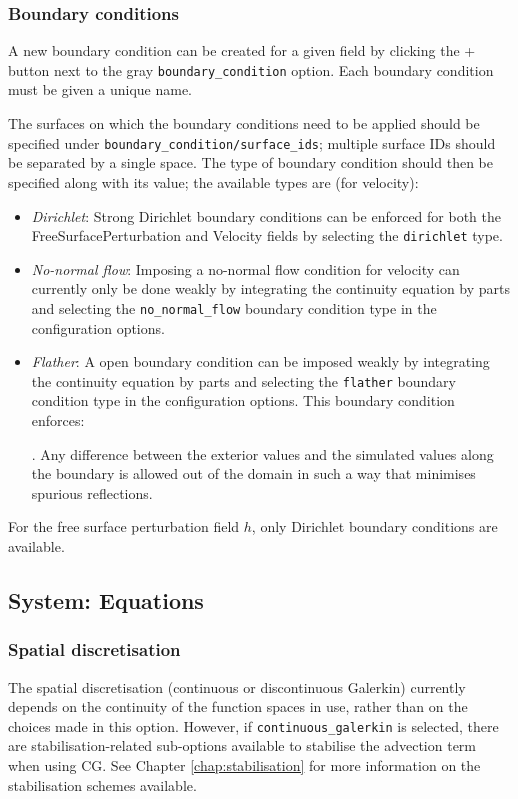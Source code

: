 \documentclass[a4paper,11pt]{report}
\begin{document}
\subsubsection{Boundary conditions}
A new boundary condition can be created for a given field by clicking the + button next to the gray \texttt{boundary\_condition} option. Each boundary condition must be given a unique name.

The surfaces on which the boundary conditions need to be applied should be specified under \texttt{boundary\_condition/surface\_ids}; multiple surface IDs should be separated by a single space. The type of boundary condition should then be specified along with its value; the available types are (for velocity):
\begin{itemize}
   \item \textit{Dirichlet}: Strong Dirichlet boundary conditions can be enforced for both the FreeSurfacePerturbation and Velocity fields by selecting the \texttt{dirichlet} type.
   \item \textit{No-normal flow}: Imposing a no-normal flow condition for velocity can currently only be done weakly by integrating the continuity equation by parts and selecting the \texttt{no\_normal\_flow} boundary condition type in the configuration options.
   \item \textit{Flather}: A \cite{Flather_1976} open boundary condition can be imposed weakly by integrating the continuity equation by parts and selecting the \texttt{flather} boundary condition type in the configuration options. This boundary condition enforces:
   
   
   . Any difference between the exterior values and the simulated values along the boundary is allowed out of the domain in such a way that minimises spurious reflections.
\end{itemize}

For the free surface perturbation field $h$, only Dirichlet boundary conditions are available.

\subsection{System: Equations}

\subsubsection{Spatial discretisation}
The spatial discretisation (continuous or discontinuous Galerkin) currently depends on the continuity of the function spaces in use, rather than on the choices made in this option. However, if \texttt{continuous\_galerkin} is selected, there are stabilisation-related sub-options available to stabilise the advection term when using CG. See Chapter \ref{chap:stabilisation} for more information on the stabilisation schemes available.
\end{document}
